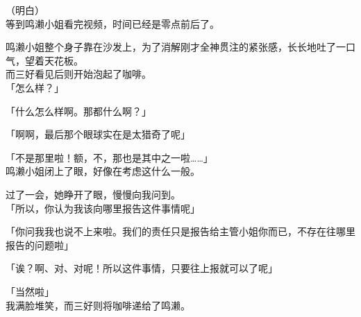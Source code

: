 （明白）\\

等到鸣濑小姐看完视频，时间已经是零点前后了。

鸣濑小姐整个身子靠在沙发上，为了消解刚才全神贯注的紧张感，长长地吐了一口气，望着天花板。\\

而三好看见后则开始泡起了咖啡。\\

「怎么样？」

「什么怎么样啊。那都什么啊？」

「啊啊，最后那个眼球实在是太猎奇了呢」

「不是那里啦！额，不，那也是其中之一啦……」\\

鸣濑小姐闭上了眼，好像在考虑这什么一般。

过了一会，她睁开了眼，慢慢向我问到。\\

「所以，你认为我该向哪里报告这件事情呢」

「你问我我也说不上来啦。我们的责任只是报告给主管小姐你而已，不存在往哪里报告的问题啦」

「诶？啊、对、对呢！所以这件事情，只要往上报就可以了呢」

「当然啦」\\

我满脸堆笑，而三好则将咖啡递给了鸣濑。\\

